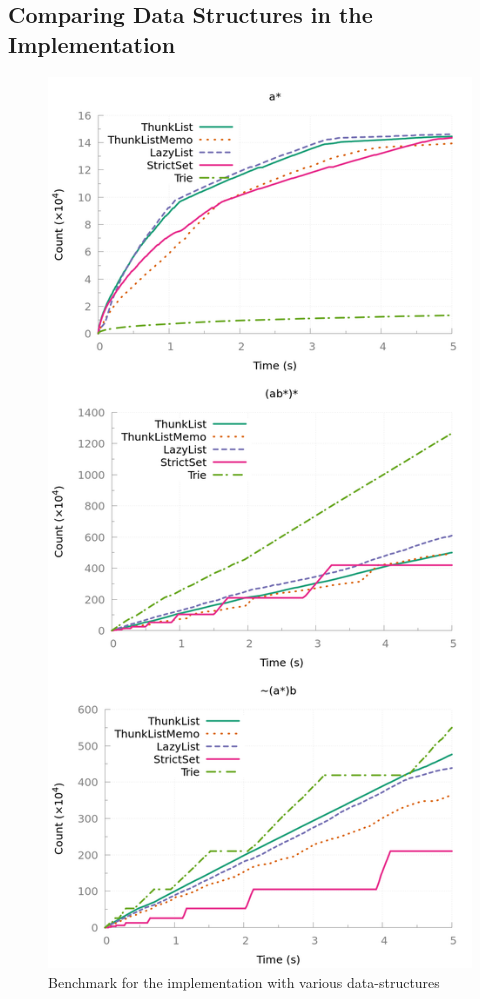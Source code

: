 \subsection{Comparing Data Structures in the \ocaml Implementation}
\label{sec:bench:ocaml}
\begin{figure}[!tp]
  \centering
  \includegraphics[width=\linewidth]{measure/ocaml_all.png}
  \caption{Benchmark for the \ocaml implementation with various data-structures}
  \label{bench:ocaml:all}
\end{figure}


